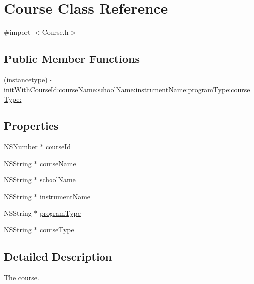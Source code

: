 \hypertarget{interface_course}{\section{\-Course \-Class \-Reference}
\label{interface_course}
}


{\ttfamily \#import $<$\-Course.\-h$>$}

\subsection*{\-Public \-Member \-Functions}
\begin{DoxyCompactItemize}
\item 
(instancetype) -\/ \hyperlink{interface_course_a1047820e29b5f4aae53c3a161824823d}{init\-With\-Course\-Id\-:course\-Name\-:school\-Name\-:instrument\-Name\-:program\-Type\-:course\-Type\-:}
\end{DoxyCompactItemize}
\subsection*{\-Properties}
\begin{DoxyCompactItemize}
\item 
\-N\-S\-Number $\ast$ \hyperlink{interface_course_ad03513473cc83651e36749f9e5c5be69}{course\-Id}
\item 
\-N\-S\-String $\ast$ \hyperlink{interface_course_ace0d7cddc92e6c0d10b1cac95302e1de}{course\-Name}
\item 
\-N\-S\-String $\ast$ \hyperlink{interface_course_abb8051bfc97aff735cbb00e75f2fef65}{school\-Name}
\item 
\-N\-S\-String $\ast$ \hyperlink{interface_course_a907b62f431b16309eb1dddb6786f2456}{instrument\-Name}
\item 
\-N\-S\-String $\ast$ \hyperlink{interface_course_a75b262e8885356165a97a15b69bf1ff1}{program\-Type}
\item 
\-N\-S\-String $\ast$ \hyperlink{interface_course_a16df4d28af9a7f6e91a5aa4ce583453d}{course\-Type}
\end{DoxyCompactItemize}


\subsection{\-Detailed \-Description}
\-The course. 

